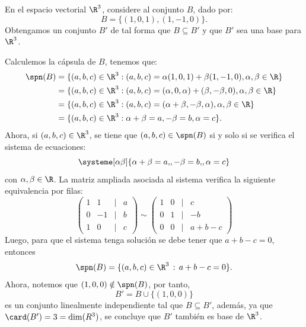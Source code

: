 \documentclass[compacto,10pt]{pubciencias-notas}
\begin{document}
\begin{ejem}\hspace{0pt}
En el espacio vectorial $\R^{3}$, considere al conjunto $B$, dado por:
\[
    B = \{(1, 0, 1), (1, -1, 0)\}.
\]
Obtengamos un conjunto $B'$ de tal forma que $B \subseteq B'$ y que $B'$ sea una base para $\R^{3}$.

Calculemos la cápsula de $B$, tenemos que:
\begin{align*}
\spn(B) &= 
    \{(a, b, c) \in \R^{3}:(a, b, c)=\alpha (1, 0, 1)+\beta (1, -1, 0), \alpha, \beta\in\R\}\\
    &=\{(a, b, c) \in \R^{3}:(a, b, c)=(\alpha , 0, \alpha)+ (\beta, -\beta, 0), \alpha, \beta\in\R \}\\
    &=\{(a, b, c) \in \R^{3}:(a, b, c)=(\alpha +\beta,-\beta , \alpha), \alpha, \beta\in\R\}\\
    &=\{(a, b, c) \in \R^{3}:\alpha +\beta=a,-\beta =b, \alpha=c \}.
\end{align*}
Ahora, si $(a,b,c)\in\R^{3}$, se tiene que $(a,b,c)\in\spn(B)$ si y solo si se verifica el sistema de ecuaciones:
\[
    \systeme[\alpha \beta]{\alpha + \beta =a{,}, -\beta=b{,},\alpha=c}
\]
con $\alpha, \beta \in\R$. La matriz ampliada asociada al sistema verifica la siguiente equivalencia por filas:
\[
\begin{pmatrix}
1&1&|&a\\
0&-1&|&b\\
1&0&|&c
\end{pmatrix}
\sim 
\begin{pmatrix}
1&0&|&c\\
0&1&|&-b\\
0&0&|&a+b-c
\end{pmatrix}
\]
Luego, para que el sistema tenga solución se debe tener que $a+b-c=0$, entonces
\[
    \spn(B) = \{(a,b,c)\in\R^{3}\,:\,a+b-c=0\}.
\]
Ahora, notemos que $(1,0,0)\notin\spn(B)$, por tanto,
\[
    B' = B \cup \{(1,0,0)\}
\]
es un conjunto linealmente independiente tal que $B\subseteq B'$, además, ya que $\card(B')=3 = \dim(R^{3})$, se concluye que $B'$ también es base de $\R^{3}$.
\end{ejem}
    
\end{document}
